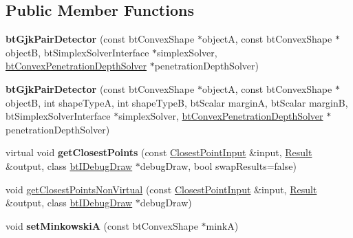 \subsection*{Public Member Functions}
\begin{DoxyCompactItemize}
\item 
\hypertarget{classbt_gjk_pair_detector_a57f8635def7c26f5eebada28c1e6f2e0}{{\bfseries bt\+Gjk\+Pair\+Detector} (const bt\+Convex\+Shape $\ast$object\+A, const bt\+Convex\+Shape $\ast$object\+B, bt\+Simplex\+Solver\+Interface $\ast$simplex\+Solver, \hyperlink{classbt_convex_penetration_depth_solver}{bt\+Convex\+Penetration\+Depth\+Solver} $\ast$penetration\+Depth\+Solver)}\label{classbt_gjk_pair_detector_a57f8635def7c26f5eebada28c1e6f2e0}

\item 
\hypertarget{classbt_gjk_pair_detector_a1de8180060fdf40cda4a00c9c9493c26}{{\bfseries bt\+Gjk\+Pair\+Detector} (const bt\+Convex\+Shape $\ast$object\+A, const bt\+Convex\+Shape $\ast$object\+B, int shape\+Type\+A, int shape\+Type\+B, bt\+Scalar margin\+A, bt\+Scalar margin\+B, bt\+Simplex\+Solver\+Interface $\ast$simplex\+Solver, \hyperlink{classbt_convex_penetration_depth_solver}{bt\+Convex\+Penetration\+Depth\+Solver} $\ast$penetration\+Depth\+Solver)}\label{classbt_gjk_pair_detector_a1de8180060fdf40cda4a00c9c9493c26}

\item 
\hypertarget{classbt_gjk_pair_detector_a42505a0ccc728c82595febe9af3a3bc8}{virtual void {\bfseries get\+Closest\+Points} (const \hyperlink{structbt_discrete_collision_detector_interface_1_1_closest_point_input}{Closest\+Point\+Input} \&input, \hyperlink{structbt_discrete_collision_detector_interface_1_1_result}{Result} \&output, class \hyperlink{classbt_i_debug_draw}{bt\+I\+Debug\+Draw} $\ast$debug\+Draw, bool swap\+Results=false)}\label{classbt_gjk_pair_detector_a42505a0ccc728c82595febe9af3a3bc8}

\item 
void \hyperlink{classbt_gjk_pair_detector_abc29953dd7aee59e9ca887963c26c8c2}{get\+Closest\+Points\+Non\+Virtual} (const \hyperlink{structbt_discrete_collision_detector_interface_1_1_closest_point_input}{Closest\+Point\+Input} \&input, \hyperlink{structbt_discrete_collision_detector_interface_1_1_result}{Result} \&output, class \hyperlink{classbt_i_debug_draw}{bt\+I\+Debug\+Draw} $\ast$debug\+Draw)
\item 
\hypertarget{classbt_gjk_pair_detector_aa1c126f716f8c80f355ad48a5234ca73}{void {\bfseries set\+Minkowski\+A} (const bt\+Convex\+Shape $\ast$mink\+A)}\label{classbt_gjk_pair_detector_aa1c126f716f8c80f355ad48a5234ca73}


\end{DoxyCompactItemize}
